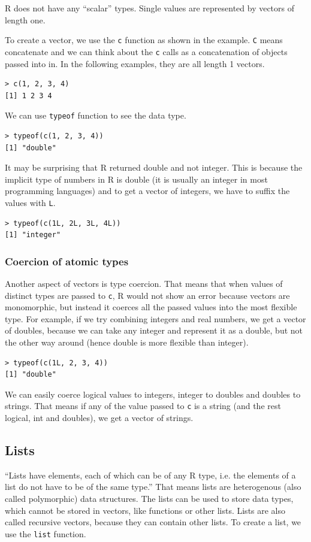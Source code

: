 \documentclass[thesis=B,english]{FITthesis}[2012/10/20]
\begin{document}
R does not have any “scalar” types. Single values are represented by vectors of length one.

To create a vector, we use the \verb|c| function as shown in the example. \verb|C| means concatenate and we can think about the \verb|c| calls as a concatenation of objects passed into in. In the following examples, they are all length 1 vectors.

\begin{verbatim}
> c(1, 2, 3, 4)
[1] 1 2 3 4
\end{verbatim}

We can use \verb|typeof| function to see the data type.

\begin{verbatim}
> typeof(c(1, 2, 3, 4))
[1] "double"
\end{verbatim}

It may be surprising that R returned double and not integer. This is because the implicit type of numbers in R is double (it is usually an integer in most programming languages) and to get a vector of integers, we have to suffix the values with \verb|L|.

\begin{verbatim}
> typeof(c(1L, 2L, 3L, 4L))
[1] "integer"
\end{verbatim}

\subsubsection{Coercion of atomic types}
Another aspect of vectors is type coercion. That means that when values of distinct types are passed to \verb|c|, R would not show an error because vectors are monomorphic, but instead it coerces all the passed values into the most flexible type. For example, if we try combining integers and real numbers, we get a vector of doubles, because we can take any integer and represent it as a double, but not the other way around (hence double is more flexible than integer).

\begin{verbatim}
> typeof(c(1L, 2, 3, 4))
[1] "double"
\end{verbatim}

We can easily coerce logical values to integers, integer to doubles and doubles to strings. That means if any of the value passed to \verb|c| is a string (and the rest logical, int and doubles), we get a vector of strings.

\subsection{Lists}
``Lists have elements, each of which can be of any R type, i.e. the elements of a list do not have to be of the same type.'' \cite{specs} That means lists are heterogenous (also called polymorphic) data structures. The lists can be used to store data types, which cannot be stored in vectors, like functions or other lists. Lists are also called recursive vectors, because they can contain other lists. To create a list, we use the \verb|list| function.
\end{document}
